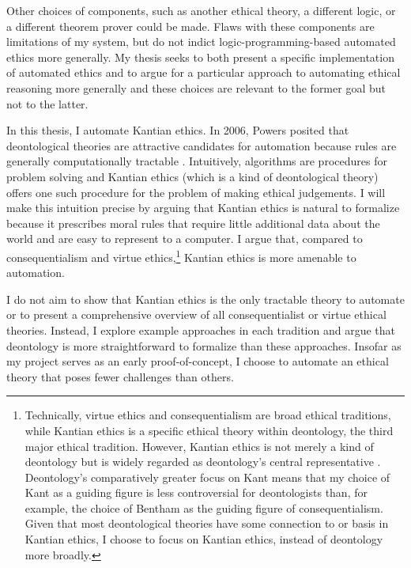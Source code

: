 \begin{isabellebody}
\begin{isamarkuptext}
Other choices of components, such as another ethical theory, a different logic, or a different theorem 
prover could be made. Flaws with these components are limitations of my system, but do not 
indict logic-programming-based automated ethics more generally. My thesis seeks to 
both present a specific implementation of automated ethics and to argue for a particular approach 
to automating ethical reasoning more generally and these choices are relevant to the former goal but 
not to the latter.%
\end{isamarkuptext}\isamarkuptrue%
%
\isadelimdocument
%
\endisadelimdocument
%
\isatagdocument
%
\isamarkuptrue%
%
\endisatagdocument
{\isafolddocument}%
%
\isadelimdocument
%
\endisadelimdocument
%
\begin{isamarkuptext}%
In this thesis, I automate Kantian ethics. In 2006, Powers posited that deontological theories are 
attractive candidates for automation because rules are generally computationally tractable \cite[1]{powers}. 
Intuitively, algorithms are procedures for problem solving and Kantian ethics (which is a kind 
of deontological theory) offers one such 
procedure for the problem of making ethical judgements. I will make this intuition precise by
arguing that Kantian ethics is natural to formalize because it prescribes moral rules that require 
little additional data about the world and are easy to represent to a computer. I argue that, compared to 
consequentialism and virtue ethics,\footnote{Technically, virtue ethics and
consequentialism are broad ethical traditions, while Kantian ethics is a specific ethical theory within
deontology, the third major ethical tradition. However, Kantian ethics is not merely a kind of deontology
but is widely regarded as deontology's central representative \citep{sepdeont}. Deontology's comparatively 
greater focus on Kant means that my choice of Kant as a guiding figure is less controversial for deontologists 
than, for example, the choice of Bentham as the guiding figure of consequentialism. Given that most deontological
theories have some connection to or basis in Kantian ethics, I choose to focus on Kantian ethics, instead
of deontology more broadly. } Kantian ethics is more amenable to automation.

I do not aim to show that Kantian ethics is the only tractable theory to automate or
to present a comprehensive overview of all consequentialist or virtue ethical theories. Instead, I 
explore example approaches in each tradition and argue that deontology is more straightforward 
to formalize than these approaches. Insofar as my project serves 
as an early proof-of-concept, I choose to automate an ethical theory that 
poses fewer challenges than others. 


\end{isamarkuptext}
\end{isabellebody}
